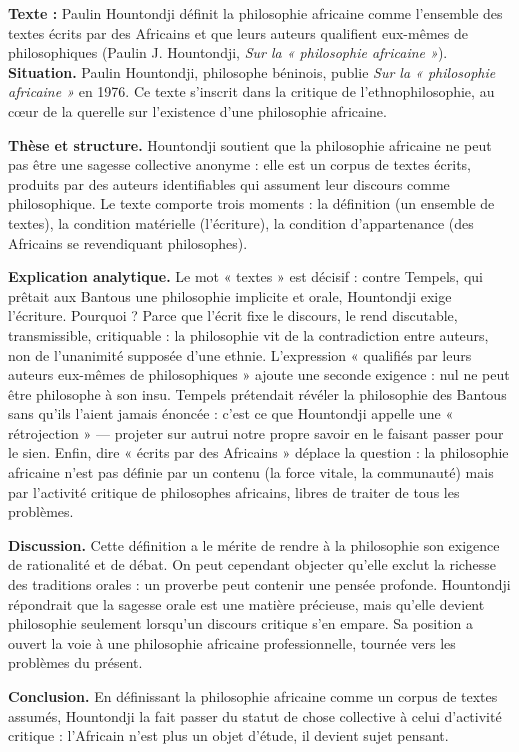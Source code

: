 \documentclass[11pt]{article}
\begin{document}
\begin{exoresolu}
\textbf{Texte :} Paulin Hountondji définit la philosophie africaine comme l'ensemble des textes écrits par des Africains et que leurs auteurs qualifient eux-mêmes de philosophiques (Paulin J. Hountondji, \emph{Sur la « philosophie africaine »}).
\tcblower
\textbf{Situation.} Paulin Hountondji, philosophe béninois, publie \emph{Sur la « philosophie africaine »} en 1976. Ce texte s'inscrit dans la critique de l'ethnophilosophie, au cœur de la querelle sur l'existence d'une philosophie africaine.

\textbf{Thèse et structure.} Hountondji soutient que la philosophie africaine ne peut pas être une sagesse collective anonyme : elle est un corpus de textes écrits, produits par des auteurs identifiables qui assument leur discours comme philosophique. Le texte comporte trois moments : la définition (un ensemble de textes), la condition matérielle (l'écriture), la condition d'appartenance (des Africains se revendiquant philosophes).

\textbf{Explication analytique.} Le mot « textes » est décisif : contre Tempels, qui prêtait aux Bantous une philosophie implicite et orale, Hountondji exige l'écriture. Pourquoi ? Parce que l'écrit fixe le discours, le rend discutable, transmissible, critiquable : la philosophie vit de la contradiction entre auteurs, non de l'unanimité supposée d'une ethnie. L'expression « qualifiés par leurs auteurs eux-mêmes de philosophiques » ajoute une seconde exigence : nul ne peut être philosophe à son insu. Tempels prétendait révéler la philosophie des Bantous sans qu'ils l'aient jamais énoncée : c'est ce que Hountondji appelle une « rétrojection » — projeter sur autrui notre propre savoir en le faisant passer pour le sien. Enfin, dire « écrits par des Africains » déplace la question : la philosophie africaine n'est pas définie par un contenu (la force vitale, la communauté) mais par l'activité critique de philosophes africains, libres de traiter de tous les problèmes.

\textbf{Discussion.} Cette définition a le mérite de rendre à la philosophie son exigence de rationalité et de débat. On peut cependant objecter qu'elle exclut la richesse des traditions orales : un proverbe peut contenir une pensée profonde. Hountondji répondrait que la sagesse orale est une matière précieuse, mais qu'elle devient philosophie seulement lorsqu'un discours critique s'en empare. Sa position a ouvert la voie à une philosophie africaine professionnelle, tournée vers les problèmes du présent.

\textbf{Conclusion.} En définissant la philosophie africaine comme un corpus de textes assumés, Hountondji la fait passer du statut de chose collective à celui d'activité critique : l'Africain n'est plus un objet d'étude, il devient sujet pensant.
\end{exoresolu}
\end{document}
